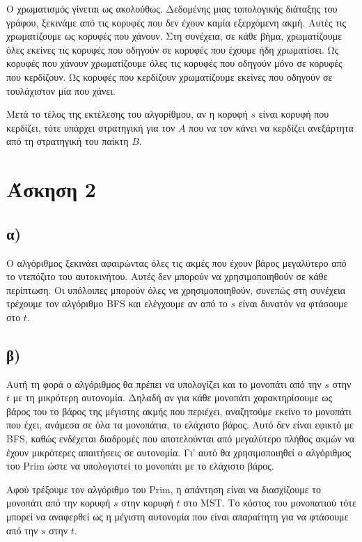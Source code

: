 \documentclass[11pt,a4paper,oneside]{report}
\begin{document}
Ο χρωματισμός γίνεται ως ακολούθως. Δεδομένης μιας τοπολογικής διάταξης του γράφου, ξεκινάμε από τις κορυφές που δεν έχουν καμία εξερχόμενη ακμή. Αυτές τις χρωματίζουμε ως κορυφές που χάνουν. Στη συνέχεια, σε κάθε βήμα, χρωματίζουμε όλες εκείνες τις κορυφές που οδηγούν σε κορυφές που έχουμε ήδη χρωματίσει. Ως κορυφές που χάνουν χρωματίζουμε όλες τις κορυφές που οδηγούν μόνο σε κορυφές που κερδίζουν. Ως κορυφές που κερδίζουν χρωματίζουμε εκείνες που οδηγούν σε τουλάχιστον μία που χάνει.

Μετά το τέλος της εκτέλεσης του αλγορίθμου, αν η κορυφή $s$ είναι κορυφή που κερδίζει, τότε υπάρχει στρατηγική για τον $A$ που να τον κάνει να κερδίζει ανεξάρτητα από τη στρατηγική του παίκτη $B$.

\section*{Άσκηση 2}
\subsection*{α)} Ο αλγόριθμος ξεκινάει αφαιρώντας όλες τις ακμές που έχουν βάρος μεγαλύτερο από το ντεπόζιτο του αυτοκινήτου. Αυτές δεν μπορούν να χρησιμοποιηθούν σε κάθε περίπτωση. Οι υπόλοιπες μπορούν όλες να χρησιμοποιηθούν, συνεπώς στη συνέχεια τρέχουμε τον αλγόριθμο \textlatin{BFS} και ελέγχουμε αν από το $s$ είναι δυνατόν να φτάσουμε στο $t$.

\subsection*{β)} Αυτή τη φορά ο αλγόριθμος θα πρέπει να υπολογίζει και το μονοπάτι από την $s$ στην $t$ με τη μικρότερη αυτονομία. Δηλαδή αν για κάθε μονοπάτι χαρακτηρίσουμε ως βάρος του το βάρος της μέγιστης ακμής που περιέχει, αναζητούμε εκείνο το μονοπάτι που έχει, ανάμεσα σε όλα τα μονοπάτια, το ελάχιστο βάρος. Αυτό δεν είναι εφικτό με \textlatin{BFS}, καθώς ενδέχεται διαδρομές που αποτελούνται από μεγαλύτερο πλήθος ακμών να έχουν μικρότερες απαιτήσεις σε αυτονομία. Γι' αυτό θα χρησιμοποιηθεί ο αλγόριθμος του \textlatin{Prim} ώστε να υπολογιστεί το μονοπάτι με το ελάχιστο βάρος.

Αφού τρέξουμε τον αλγόριθμο του \textlatin{Prim}, η απάντηση είναι να διασχίζουμε το μονοπάτι από την κορυφή $s$ στην κορυφή $t$ στο \textlatin{MST}. Το κόστος του μονοπατιού τότε μπορεί να αναφερθεί ως η μέγιστη αυτονομία που είναι απαραίτητη για να φτάσουμε από την $s$ στην $t$. 
\end{document}
